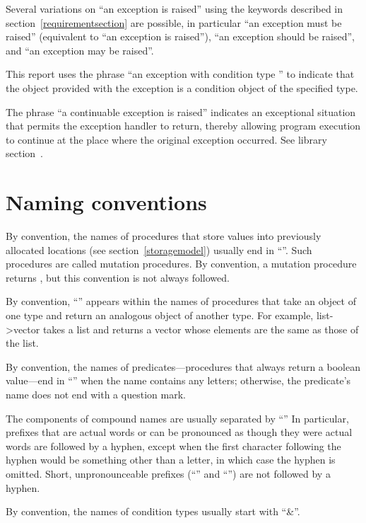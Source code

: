 Several variations on ``an exception is raised'' using the keywords
described in section~\ref{requirementsection} are possible, in
particular ``an exception must be raised'' (equivalent to ``an
exception is raised''), ``an exception should be raised'', and ``an
exception may be raised''.

This report uses the phrase ``an exception with condition type ''
to indicate that the object provided with the
exception is a condition object of the specified type.

The phrase ``a continuable exception is raised'' indicates an
exceptional situation that permits the exception handler to return,
thereby allowing program execution to continue at the place where the
original exception occurred.  See library
section~.

\section{Naming conventions}

By convention, the names of procedures that store values into previously
allocated locations (see section~\ref{storagemodel}) usually end in
``\ide{!}''.
Such procedures are called mutation procedures.
By convention, a mutation procedure returns
\unspecifiedreturn,
but this convention is not always followed.

By convention, ``\ide{->}'' appears within the names of procedures that
take an object of one type and return an analogous object of another type.
For example, {\cf list->vector} takes a list and returns a vector whose
elements are the same as those of the list.

By convention, the names of predicates---procedures that always return
a boolean value---end in ``'' when the name contains any
letters; otherwise, the predicate's name does not end with a question
mark.

The components of compound names are usually separated by ``\ide{-}''
In particular, prefixes that are actual words or can be pronounced as
though they were actual words are followed by a hyphen, except when
the first character following the hyphen would be something other than
a letter, in which case the hyphen is omitted.  Short,
unpronounceable prefixes (``'' and ``'') are not
followed by a hyphen.

By convention, the names of condition types usually start with
``{\cf\&}''.

